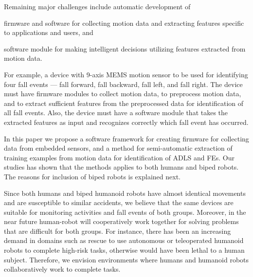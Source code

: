 \documentclass{IEEEtran}
\begin{document}
\par
Remaining major challenges include automatic development of \begin{inparaenum}[($i$)] \item firmware and software for collecting motion data and  extracting features specific to applications and users, and \item software module for making intelligent decisions utilizing features extracted from motion data. \end{inparaenum}
For example, a device with 9-axis MEMS motion sensor to be used for identifying four fall events --- fall forward, fall backward, fall left, and fall right. The device must have firmware modules to collect motion data, to preprocess motion data, and to extract sufficient features from the preprocessed data for identification of all fall events. Also, the device must have a software module that takes the extracted features as input and recognizes correctly  which fall event has occurred.
\par
In this paper we  propose a software framework for creating firmware for collecting data from embedded sensors, and a method for semi-automatic extraction of training examples from motion data for identification of ADLS and FEs. Our studies has shown that the methods applies to both humans and biped robots. The reasons for inclusion of biped robots is explained next.


\par
Since both humans and biped humanoid robots have almost identical movements and are susceptible to 
similar accidents, we believe that the same devices are suitable for monitoring activities and fall events of both 
groups. Moreover, in the near future human-robot will cooperatively work together for solving problems that are difficult for both groups.  For instance, there has been an increasing demand in 
domains such as rescue to use autonomous or teleoperated humanoid robots to complete high-risk 
tasks, otherwise would have been lethal to a human subject. Therefore, we envision environments 
where humans and humanoid robots collaboratively work to complete tasks. 
\end{document}
